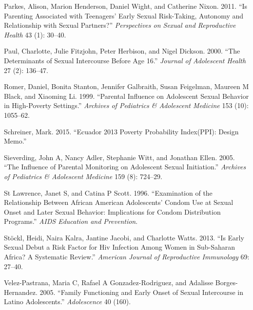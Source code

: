 \documentclass[
]{article}
\newlength{\cslhangindent}
\newenvironment{cslreferences}%
  {\setlength{\parindent}{0pt}%
  \everypar{\setlength{\hangindent}{\cslhangindent}}\ignorespaces}%
  {\par}
\begin{document}
\begin{cslreferences}
\leavevmode\hypertarget{ref-parkes2011parenting}{}%
Parkes, Alison, Marion Henderson, Daniel Wight, and Catherine Nixon.
2011. ``Is Parenting Associated with Teenagers' Early Sexual
Risk-Taking, Autonomy and Relationship with Sexual Partners?''
\emph{Perspectives on Sexual and Reproductive Health} 43 (1): 30--40.

\leavevmode\hypertarget{ref-paul2000determinants}{}%
Paul, Charlotte, Julie Fitzjohn, Peter Herbison, and Nigel Dickson.
2000. ``The Determinants of Sexual Intercourse Before Age 16.''
\emph{Journal of Adolescent Health} 27 (2): 136--47.

\leavevmode\hypertarget{ref-romer1999parental}{}%
Romer, Daniel, Bonita Stanton, Jennifer Galbraith, Susan Feigelman,
Maureen M Black, and Xiaoming Li. 1999. ``Parental Influence on
Adolescent Sexual Behavior in High-Poverty Settings.'' \emph{Archives of
Pediatrics \& Adolescent Medicine} 153 (10): 1055--62.

\leavevmode\hypertarget{ref-schreiner2015ecuador}{}%
Schreiner, Mark. 2015. ``Ecuador 2013 Poverty Probability Index(PPI):
Design Memo.''

\leavevmode\hypertarget{ref-sieverding2005influence}{}%
Sieverding, John A, Nancy Adler, Stephanie Witt, and Jonathan Ellen.
2005. ``The Influence of Parental Monitoring on Adolescent Sexual
Initiation.'' \emph{Archives of Pediatrics \& Adolescent Medicine} 159
(8): 724--29.

\leavevmode\hypertarget{ref-st1996examination}{}%
St Lawrence, Janet S, and Catina P Scott. 1996. ``Examination of the
Relationship Between African American Adolescents' Condom Use at Sexual
Onset and Later Sexual Behavior: Implications for Condom Distribution
Programs.'' \emph{AIDS Education and Prevention}.

\leavevmode\hypertarget{ref-stockl2013early}{}%
Stöckl, Heidi, Naira Kalra, Jantine Jacobi, and Charlotte Watts. 2013.
``Is Early Sexual Debut a Risk Factor for Hiv Infection Among Women in
Sub-Saharan Africa? A Systematic Review.'' \emph{American Journal of
Reproductive Immunology} 69: 27--40.

\leavevmode\hypertarget{ref-velez2005family}{}%
Velez-Pastrana, Maria C, Rafael A Gonzadez-Rodriguez, and Adalisse
Borges-Hernandez. 2005. ``Family Functioning and Early Onset of Sexual
Intercourse in Latino Adolescents.'' \emph{Adolescence} 40 (160).
\end{cslreferences}
\end{document}
